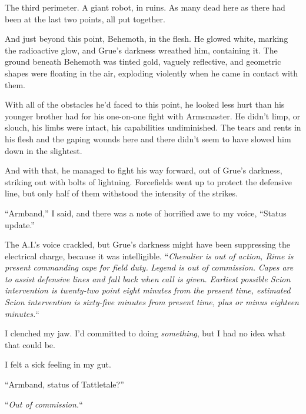 The third perimeter.  A giant robot, in ruins.  As many dead here as there had been at the last two points, all put together.



And just beyond this point, Behemoth, in the flesh.  He glowed white, marking the radioactive glow, and Grue's darkness wreathed him, containing it.  The ground beneath Behemoth was tinted gold, vaguely reflective, and geometric shapes were floating in the air, exploding violently when he came in contact with them.



With all of the obstacles he'd faced to this point, he looked less hurt than his younger brother had for his one-on-one fight with Armsmaster.  He didn't limp, or slouch, his limbs were intact, his capabilities undiminished.  The tears and rents in his flesh and the gaping wounds here and there didn't seem to have slowed him down in the slightest.



And with that, he managed to fight his way forward, out of Grue's darkness, striking out with bolts of lightning.  Forcefields went up to protect the defensive line, but only half of them withstood the intensity of the strikes.



``Armband,'' I said, and there was a note of horrified awe to my voice, ``Status update.''



The A.I.'s voice crackled, but Grue's darkness might have been suppressing the electrical charge, because it was intelligible.  ``\emph{Chevalier is out of action, Rime is present commanding cape for field duty. }\emph{Legend is out of commission. }\emph{Capes are to assist defensive lines and fall back when call is given.  Earliest possible Scion intervention is twenty-two point eight minutes from the present time, estimated Scion intervention is sixty-five minutes from present time, plus or minus eighteen minutes.}``



I clenched my jaw.  I'd committed to doing \emph{something}, but I had no idea what that could be.



I felt a sick feeling in my gut.



``Armband, status of Tattletale?''



``\emph{Out of commission.}``



